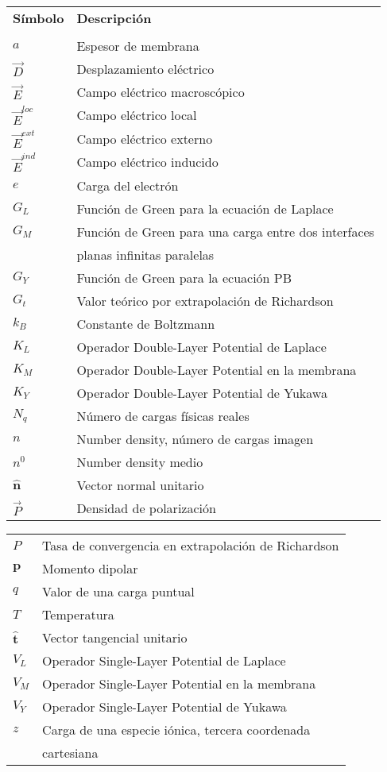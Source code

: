 
\begin{tabular}{ll}
	\textbf{Símbolo} & \textbf{Descripción} \\
	& \\
	$a$ & Espesor de membrana   \\
	$\vec{D}$ &  Desplazamiento eléctrico \\
	$\vec{E}$ & Campo eléctrico macroscópico \\
	$\vec{E}^{loc}$ & Campo eléctrico local \\
	$\vec{E}^{ext}$ & Campo eléctrico externo \\
	$\vec{E}^{ind}$ & Campo eléctrico inducido \\
	$e$ & Carga del electrón   \\
	$G_L$ & Función de Green para la ecuación de Laplace \\
	$G_M$ & Función de Green para una carga entre dos interfaces \\
	& planas infinitas paralelas \\
	$G_Y$ & Función de Green para la ecuación PB \\
	$G_t$ & Valor teórico por extrapolación de Richardson \\
	$k_B$ &   Constante de Boltzmann	\\
	$K_L$ & Operador Double-Layer Potential de Laplace  \\
	$K_M$ & Operador Double-Layer Potential en la membrana  \\
	$K_Y$ & Operador Double-Layer Potential de Yukawa  \\
	$N_q$ & Número de cargas físicas reales \\
	$n$ &  Number density, número de cargas imagen    \\
	$n^0$ & Number density medio \\
	$\hat{\mathbf{n}}$ & Vector normal unitario \\
	$\vec{P}$ & Densidad de polarización    \\
\end{tabular}
\newpage
\begin{tabular}{ll}
	$P$ & Tasa de convergencia en extrapolación de Richardson \\
	$\mathbf{p}$ & Momento dipolar     \\
	$q$ & Valor de una carga puntual   \\
	$T$ &   Temperatura  \\
	$\hat{\mathbf{t}}$ & Vector tangencial unitario \\
	$V_L$ & Operador Single-Layer Potential de Laplace  \\
	$V_M$ & Operador Single-Layer Potential en la membrana  \\
	$V_Y$ & Operador Single-Layer Potential de Yukawa  \\
	$z$ & Carga de una especie iónica, tercera coordenada\\
	 & cartesiana \\
\end{tabular}
\\
\\


